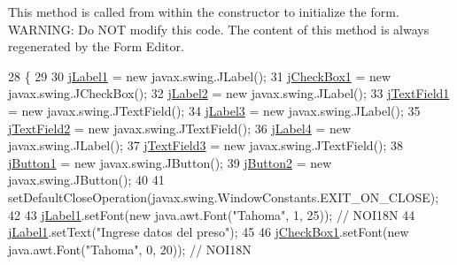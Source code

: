 This method is called from within the constructor to initialize the form. W\+A\+R\+N\+I\+NG\+: Do N\+OT modify this code. The content of this method is always regenerated by the Form Editor. 
\begin{DoxyCode}
28                                   \{
29 
30         \mbox{\hyperlink{classsoftware_1_1_ingresar_preso_a2636febe75f015393218663a91a34e0d}{jLabel1}} = \textcolor{keyword}{new} javax.swing.JLabel();
31         \mbox{\hyperlink{classsoftware_1_1_ingresar_preso_af5dd1d64cebd5001a66aa292c76e6238}{jCheckBox1}} = \textcolor{keyword}{new} javax.swing.JCheckBox();
32         \mbox{\hyperlink{classsoftware_1_1_ingresar_preso_abdc8c3f8f7c224e30ff7c4b6c96d5f3f}{jLabel2}} = \textcolor{keyword}{new} javax.swing.JLabel();
33         \mbox{\hyperlink{classsoftware_1_1_ingresar_preso_ad9f61bb0c1750694824c000a899845cf}{jTextField1}} = \textcolor{keyword}{new} javax.swing.JTextField();
34         \mbox{\hyperlink{classsoftware_1_1_ingresar_preso_a83ed6c4480193eb6924a625e224524fd}{jLabel3}} = \textcolor{keyword}{new} javax.swing.JLabel();
35         \mbox{\hyperlink{classsoftware_1_1_ingresar_preso_a5f83b859ca7fb0ef832730e50082c083}{jTextField2}} = \textcolor{keyword}{new} javax.swing.JTextField();
36         \mbox{\hyperlink{classsoftware_1_1_ingresar_preso_a5fb6376942dfd9a5ed07eb887918bea7}{jLabel4}} = \textcolor{keyword}{new} javax.swing.JLabel();
37         \mbox{\hyperlink{classsoftware_1_1_ingresar_preso_a6e52c44f802c280a2154de10ed8679fb}{jTextField3}} = \textcolor{keyword}{new} javax.swing.JTextField();
38         \mbox{\hyperlink{classsoftware_1_1_ingresar_preso_a6c00105c7f9dbaf091e58501f2f32fb9}{jButton1}} = \textcolor{keyword}{new} javax.swing.JButton();
39         \mbox{\hyperlink{classsoftware_1_1_ingresar_preso_a33ce6c95d87a5c987b9efde232b63e10}{jButton2}} = \textcolor{keyword}{new} javax.swing.JButton();
40 
41         setDefaultCloseOperation(javax.swing.WindowConstants.EXIT\_ON\_CLOSE);
42 
43         \mbox{\hyperlink{classsoftware_1_1_ingresar_preso_a2636febe75f015393218663a91a34e0d}{jLabel1}}.setFont(\textcolor{keyword}{new} java.awt.Font(\textcolor{stringliteral}{"Tahoma"}, 1, 25)); \textcolor{comment}{// NOI18N}
44         \mbox{\hyperlink{classsoftware_1_1_ingresar_preso_a2636febe75f015393218663a91a34e0d}{jLabel1}}.setText(\textcolor{stringliteral}{"Ingrese datos del preso"});
45 
46         \mbox{\hyperlink{classsoftware_1_1_ingresar_preso_af5dd1d64cebd5001a66aa292c76e6238}{jCheckBox1}}.setFont(\textcolor{keyword}{new} java.awt.Font(\textcolor{stringliteral}{"Tahoma"}, 0, 20)); \textcolor{comment}{// NOI18N}

\end{DoxyCode}
